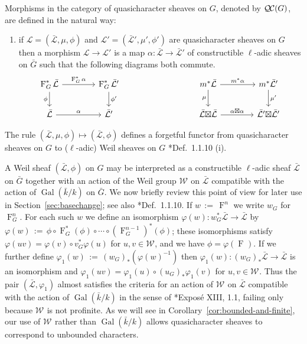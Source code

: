 \documentclass{amsart}
\makeatletter
\theoremstyle{plain}
\theoremstyle{definition}
\theoremstyle{remark}
\newcommand{\bFq}{\bar{k}}
\newcommand{\Fq}{k}
\newcommand{\Weil}[1]{\mathcal{W}_{#1}}
\DeclareMathOperator{\Gal}{Gal}
\newcommand{\Frob}[1]{\operatorname{F}_{#1}}
\newcommand{\ceq}{{\, :=\, }}
\newcommand{\qcs}[1]{{\mathcal{#1}}}
\newcommand{\gqcs}[1]{{\mathcal{\bar #1}}}
\newcommand{\QC}{{\mathcal{Q\hskip-0.8pt C}}}
\newcommand{\labitem}[2]{
\def\@itemlabel{\textbf{#1}}
\item
\def\@currentlabel{#1}\label{#2}}
\newcommand{\bG}{\bar{G}}
\newcommand{\tight}[3]{\hspace{-#1pt}{#2}\hspace{-#3pt}}
\newcommand{\LxL}{\text{$\gqcs{L} \tight{0}{\boxtimes}{0} \gqcs{L}$}}
\makeatother
\begin{document}
Morphisms in the category of quasicharacter sheaves on $G$, denoted by $\QC(G)$, are defined in the natural way:
\begin{enumerate}
\labitem{(QC.4)}{QC.4} if $\qcs{L} = (\gqcs{L},\mu,\phi)$ and
  $\qcs{L'} = (\gqcs{L'},\mu',\phi')$ are quasicharacter sheaves on $G$ then
  a morphism $\qcs{L} \to \qcs{L}'$ is a map $\alpha : \gqcs{L} \to \gqcs{L'}$
  of constructible $\ell$-adic sheaves on $\bG$ such that the following diagrams both commute.
  \[
  \begin{tikzcd}[column sep=40]
  \Frob{G}^* \gqcs{L} \rar{\Frob{G}^* \alpha} \arrow[swap]{d}{\phi} & \Frob{G}^* \gqcs{L'} \dar{\phi'}
  & & \arrow[swap]{d}{\mu} m^* \gqcs{L} \rar{m^* \alpha} & m^* \gqcs{L'} \dar{\mu'} \\
  \gqcs{L} \rar{\alpha} & \gqcs{L'}
  & {} & \LxL \rar{\tight{1}{\alpha\boxtimes \alpha}{1}} & \gqcs{L'} \tight{0}{\boxtimes}{0} \gqcs{L'}
  \end{tikzcd}
  \]
\end{enumerate}

The rule $(\gqcs{L},\mu,\phi) \mapsto (\gqcs{L},\phi)$ defines a forgetful functor from quasicharacter
sheaves on $G$ to ($\ell$-adic) Weil sheaves on $G$ \cite{deligne:80a}*{Def.~1.1.10 (i)}.

A Weil sheaf $(\gqcs{L},\phi)$ on $G$
may be interpreted as a constructible $\ell$-adic sheaf $\gqcs{L}$ on $\bG$ together with
an action of the Weil group $\Weil{}$ on $\gqcs{L}$ compatible with the action of
$\Gal(\bFq/\Fq)$ on $\bG$. We now briefly review this point of view for later use in
Section~\ref{sec:basechange}; see also \cite{deligne:80a}*{Def.~1.1.10}.  If $w \ceq \Frob{}^n$ we write $w_G$ for $\Frob{G}^n$.
For each such $w$ we define an isomorphism $\varphi(w) : w_G^* \gqcs{L}\to \gqcs{L}$ by
$
\varphi(w) \ceq  \phi \circ \Frob{G}^*(\phi) \circ \cdots \circ (\Frob{G}^{n-1})^*(\phi)
$;
these isomorphisms satisfy $\varphi(uv) = \varphi(v) \circ v_G^* \varphi(u)$ for $u,v\in \Weil{}$, and
we have $\phi = \varphi(\Frob{})$.
If we further define $\varphi_1(w) \ceq (w_G)_*(\varphi(w)^{-1})$ then
$\varphi_1(w) : (w_G)_* \gqcs{L}\to \gqcs{L}$ is an isomorphism and
$\varphi_1(uv) = \varphi_1(u) \circ (u_G)_* \varphi_1(v)$ for $u,v\in \Weil{}$.
Thus the pair $(\gqcs{L},\varphi_1)$ almost satisfies the criteria for an action of $\Weil{}$
on $\gqcs{L}$ compatible with the action of $\Gal(\bFq/\Fq)$ in the sense of
\cite{deligne:SGA4.5}*{Expos\'e XIII, 1.1}, failing only because $\Weil{}$ is not profinite.
As we will see in Corollary~\ref{cor:bounded-and-finite}, our use of $\Weil{}$ rather than $\Gal(\bFq/\Fq)$
allows quasicharacter sheaves to correspond to unbounded characters.
\end{document}
